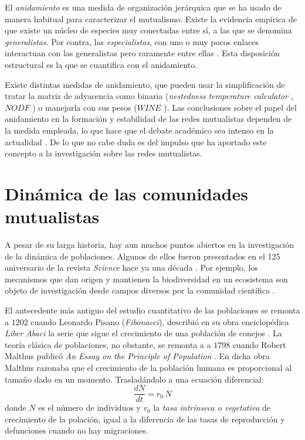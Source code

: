 El \textit{anidamiento} es una medida de organización jerárquica \cite{atmar1986nested} que se ha usado de manera habitual para caracterizar el mutualismo. Existe la evidencia empírica de que existe un núcleo de especies muy conectadas entre sí, a las que se denomina \textit{generalistas}. Por contra, las \textit{especialistas}, con uno o muy pocos enlaces interactuan con las generalistas pero raramente entre ellas \cite{bascompte2003nested, krishna2008neutral}. Esta disposición estructural es la que se cuantifica con el anidamiento.

Existe distintas medidas de anidamiento, que pueden usar la simplificación de tratar la matriz de adyacencia como binaria (\textit{nestedness temperature calculator} \cite{atmar1995nestedness}, $NODF$ \cite{almeida2008consistent}) o manejarla con sus pesos ($WINE$ \cite{galeano2009weighted}). Las conclusiones sobre el papel del anidamiento en la formación y estabilidad de las redes mutualistas dependen de la medida empleada, lo que hace que el debate académico sea intenso en la actualidad \cite{staniczenko2013ghost, strona2015new}. De lo que no cabe duda es del impulso que ha aportado este concepto a la investigación sobre las redes mutualistas.

\section{Dinámica de las comunidades mutualistas}

A pesar de su larga historia, hay aun muchos puntos abiertos en la investigación de la dinámica de poblaciones. Algunos de ellos fueron presentados en el 125 aniversario de la revista {\em Science} hace ya una década  \cite{kennedy2005,pennisi2005,stokstad2005}. Por ejemplo, los mecanismos que dan origen y mantienen la biodiversidad en un ecosistema son objeto de investigación desde campos diversos por la comunidad científica \cite{williams2000,dunne2002biodiversity,olesen2007modularity,allesina2008,bascompte2009,saavedra2009,bastolla2009,fortuna2010nestedness,encinas2012}.  

El antecedente más antiguo del estudio cuantitativo de las poblaciones se remonta a $1202$ cuando Leonardo Pisano (\textit{Fibonacci}), describió en su obra enciclopédica {\em Liber Abaci} la serie que sigue el crecimiento de una población de conejos \cite{sigler2002}. La teoría clásica de poblaciones, no obstante, se remonta a a $1798$ cuando Robert Malthus publicó {\em An Essay on the Principle of Population} \citep{malthus1798}. En dicha obra Malthus razonaba que el crecimiento de la población humana es proporcional al tamaño dado en un momento. Trasladándolo a una ecuación diferencial:
\begin{equation}
\frac{dN}{dt}=r_0\, N 
\label{eq:malthus}
\end{equation}
\noindent donde $N$ es el número de individuos y $r_0$ la {\em tasa intrínseca o vegetativa} de crecimiento de la polación, igual a la diferencia de las tasas de reproducción y defunciones cuando no hay migraciones.


